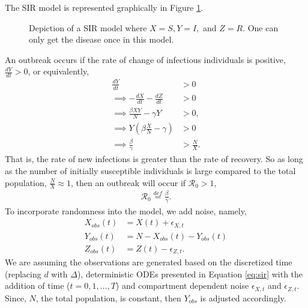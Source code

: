 \documentclass[12pt]{article}
\newcommand{\rr}{\ensuremath{\mathcal{R}_0}}
\begin{document}
The SIR model is represented graphically in Figure \ref{fig::sir}. 
\begin{figure}[h]
\centering
{}
\caption{Depiction of a SIR model where $X=S, Y=I,$ and $Z=R$.  One can only get the disease once in this model.}\label{fig::sir}
\end{figure}
An outbreak occurs if the rate of change of infectious individuals is positive, $\frac{dY}{dt} > 0$, or equivalently,
\begin{align*}
  \frac{dY}{dt} &> 0 \\
  \implies -\frac{dX}{dt} - \frac{dZ}{dt} &> 0 \\
  \implies \frac{\beta X Y}{N}  - \gamma Y &> 0 ,\\
\implies  Y \left ( \beta \frac{X}{N} - \gamma \right ) & > 0\\
\implies   \frac{\beta}{\gamma} &> \frac{N}{X}.
\end{align*}
That is,  the rate of new infections is greater than the rate of recovery.  So as long as the number of initially susceptible individuals is large compared to the total population, $\frac{N}{X} \approx 1$, then an outbreak will occur if $\rr >1$,
\begin{align*}
  \rr \overset{def}{=} \frac{\beta}{\gamma}.
  \end{align*}
  To incorporate randomness into the model, we add noise, namely,
  \begin{align}\label{eq:sir-noise}
    X_{obs}(t) &= X(t) + \epsilon_{X,t}\\
    Y_{obs}(t) &=  N - X_{obs}(t) -Y_{obs}(t)  \nonumber\\
    Z_{obs}(t) &= Z(t) - \epsilon_{Z,t}. \nonumber
  \end{align}
We are assuming the observations are generated based on the discretized time (replacing $d$ with $\Delta$), deterministic ODEs presented in Equation \ref{eq:sir} with the addition of time ($t=0, 1, \dots, T$) and compartment dependent noise $\epsilon_{X,t}$ and $\epsilon_{Z,t}$.  Since, $N$, the total population, is constant, then $Y_{obs}$ is adjusted accordingly.
\end{document}
